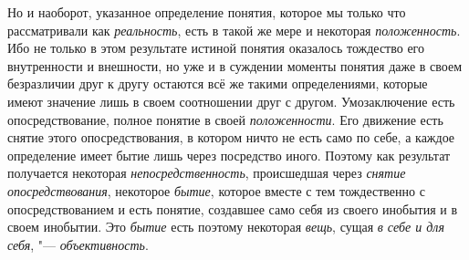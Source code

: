 Но и наоборот, указанное определение понятия, которое мы
только что рассматривали как {\em реальность}, есть в
такой же мере и некоторая {\em положенность}. Ибо
не только в этом результате истиной понятия оказалось тождество его
внутренности и внешности, но уже и в суждении моменты понятия даже в своем
безразличии друг к другу остаются всё же такими определениями, которые
имеют значение лишь в своем соотношении друг с другом. Умозаключение есть
опосредствование, полное понятие в своей {\em положенности}. Его
движение есть снятие этого опосредствования, в котором ничто не есть само
по себе, а каждое определение имеет бытие лишь через посредство иного.
Поэтому как результат получается некоторая {\em непосредственность},
происшедшая через {\em снятие опосредствования}, некоторое {\em бытие},
которое вместе с тем тождественно с опосредствованием и есть
понятие, создавшее само себя из своего инобытия и в своем инобытии. Это
{\em бытие} есть поэтому некоторая {\em вещь}, сущая {\em в себе и для
себя}, "--- {\em объективность}.

\bigskip

